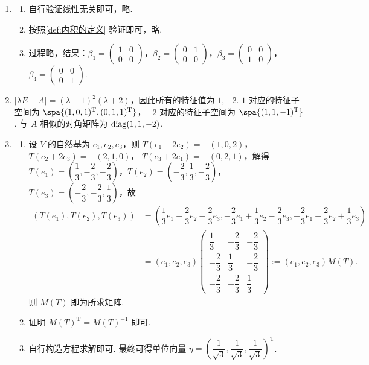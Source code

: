 \begin{enumerate}
    \item \begin{enumerate}
        \item 自行验证线性无关即可，略.
        \item 按照\autoref{def:内积的定义} 验证即可，略.
        \item 过程略，结果：$\beta_1=\begin{pmatrix}
            1 & 0 \\ 0 & 0
        \end{pmatrix}$，$\beta_2=\begin{pmatrix}
            0 & 1 \\ 0 & 0
        \end{pmatrix}$，$\beta_3=\begin{pmatrix}
            0 & 0 \\ 1 & 0
        \end{pmatrix}$，$\beta_4=\begin{pmatrix}
            0 & 0 \\ 0 & 1
        \end{pmatrix}$.
    \end{enumerate}

    \item $|\lambda E - A|=(\lambda-1)^2(\lambda+2)$，因此所有的特征值为 $1,-2$. $1$ 对应的特征子空间为 $\spa\{(1,0,1)^\mathrm{T},(0,1,1)^\mathrm{T}\}$，$-2$ 对应的特征子空间为 $\spa\{(1,1,-1)^\mathrm{T}\}$. 与 $A$ 相似的对角矩阵为 $\operatorname{diag}(1,1,-2)$.

    \item \begin{enumerate}
        \item 设 $V$ 的自然基为 $e_1,e_2,e_3$，则 $T(e_1+2e_2) = -(1,0,2)$， $T(e_2+2e_3)=-(2,1,0)$， $T(e_3+2e_1)=-(0,2,1)$，解得 $T(e_1) = (\dfrac{1}{3}, -\dfrac{2}{3}, -\dfrac{2}{3})$，$T(e_2) = (-\dfrac{2}{3}, \dfrac{1}{3}, -\dfrac{2}{3})$，$T(e_3) = (-\dfrac{2}{3}, -\dfrac{2}{3}, \dfrac{1}{3})$，故
        \begin{align*}
            (T(e_1), T(e_2), T(e_3)) &= (\dfrac{1}{3}e_1-\dfrac{2}{3}e_2-\dfrac{2}{3}e_3, -\dfrac{2}{3}e_1+\dfrac{1}{3}e_2-\dfrac{2}{3}e_3, -\dfrac{2}{3}e_1-\dfrac{2}{3}e_2+\dfrac{1}{3}e_3) \\
            &= (e_1, e_2, e_3)\begin{pmatrix}
                \dfrac{1}{3} & -\dfrac{2}{3} & -\dfrac{2}{3} \\[0.5em]
                -\dfrac{2}{3} & \dfrac{1}{3} & -\dfrac{2}{3} \\[0.5em]
                -\dfrac{2}{3} & -\dfrac{2}{3} & \dfrac{1}{3}
            \end{pmatrix} := (e_1, e_2, e_3)M(T).
        \end{align*}
        则 $M(T)$ 即为所求矩阵.
        \item 证明 $M(T)^\mathrm{T}=M(T)^{-1}$ 即可.
        \item 自行构造方程求解即可. 最终可得单位向量 $\eta=(\dfrac{1}{\sqrt{3}}, \dfrac{1}{\sqrt{3}}, \dfrac{1}{\sqrt{3}})^\mathrm{T}$.
    \end{enumerate}


\end{enumerate}
